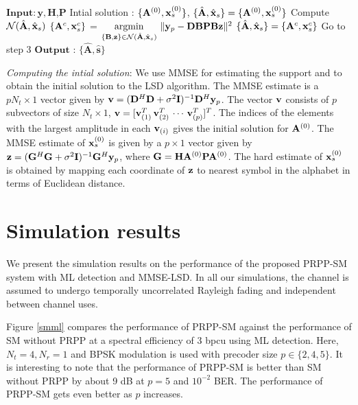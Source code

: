 \documentclass[11pt, onecolumn]{report}
\newcommand{\argmin}{\operatornamewithlimits{argmin}}
\newcommand{\vv}{{\bf v}}
\newcommand{\vx}{{\bf x}}
\newcommand{\vy}{{\bf y}}
\newcommand{\vz}{{\bf z}}
\newcommand{\pp}{{\bf P}}
\newcommand{\mi}{{\bf I}}
\newcommand{\mg}{{\bf G}}
\newcommand{\ma}{{\bf A}}
\newcommand{\mb}{{\bf B}}
\newcommand{\md}{{\bf D}}
\begin{document}
\begin{algorithm}[t]      
\caption{Listing of the proposed LSD}
   \begin{algorithmic} [1] 
      \STATE $\mathbf{Input: y, H}$,$\mathbf P$      
      \STATE Intial solution : $\{\ma^{(0)}, \vx_s^{(0)}\}$,  $\{\hat{\ma}, \hat{\vx}_s\}=\{\ma^{(0)}, \vx_s^{(0)}\}$
      \STATE Compute ${\cal N}(\hat{\ma}, \hat{\vx}_s)$
      \STATE $\{\ma^c, \vx_s^c\}$ = $\argmin\limits_{\{\mb,\vz\}\in{\cal N}(\hat{\ma}, \hat{\vx}_s)} \, \|\vy_p-\md\mb\pp\mb\vz\|^2$
	\IF{ $\|\vy_p-\md\ma^c\pp\ma^c\vx_s^c\|^2 < \|\vy_p-\md\hat{\ma}\pp\hat{\ma}\hat{\vx}_s\|^2 $}
	\STATE  $\{\hat{\ma}, \hat{\vx}_s\}=\{\ma^c, \vx_s^c\}$
	\STATE  Go to step 3
	\ENDIF 
      \STATE $\mathbf{Output}$ : $ \{\mathbf {\hat{A}},\mathbf {\hat{s}}\}$
\vspace{3mm}
\end{algorithmic}
\label{algo}
\end{algorithm} 

{\em Computing the intial solution}: We use MMSE for estimating the support and to 
obtain the initial solution to the LSD algorithm.  The MMSE
estimate is a $pN_t\times 1$ vector given by
$\vv=(\md^H\md+\sigma^2\mi)^{-1}\md^H\vy_p$. The vector $\vv$
consists of $p$ subvectors of size $N_t\times 1$,
$\vv=[\vv_{(1)}^T \,\vv_{(2)}^T \, \cdots \, \vv_{(p)}^T]^T$.
The indices of the elements with the largest amplitude in each
$\vv_{(i)}$ gives the initial solution for $\ma^{(0)}$. The  MMSE estimate of  $\vx_s ^{(0)}$ is given by a $p\times 1$ vector given by
$\vz=(\mg^H\mg+\sigma^2\mi)^{-1}\mg^H\vy_p$, where $\mathbf G=\mathbf H\mathbf \ma^{(0)}\mathbf P\mathbf \ma^{(0)} $. The hard estimate of $\vx_s^{(0)} $  is obtained by mapping each coordinate of $\vz$ to nearest symbol in the alphabet in terms of Euclidean distance.

\section{Simulation results}

We present the simulation results on the performance of the proposed PRPP-SM system with ML detection and MMSE-LSD. In all our simulations,  the channel is assumed to undergo temporally uncorrelated Rayleigh fading and independent between channel uses. 

Figure \ref{smml} compares the performance of PRPP-SM against the performance of SM without PRPP at a spectral efficiency of 3 bpcu using ML detection. Here, $N_t=4, N_r=1$ and BPSK modulation is used with precoder size  $ p \in\{2,4,5\}$. It is interesting to note that the performance of PRPP-SM is better than SM without PRPP by about 9 dB at $p=5$ and $10^{-2}$ BER. The performance of PRPP-SM gets even  better as $p$ increases.
\end{document}
